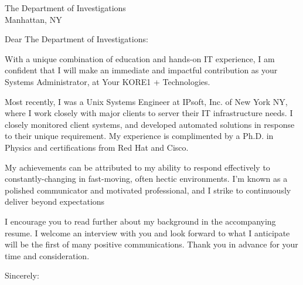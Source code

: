 \documentclass[
    jphafner,
    fontsize=11pt,
    foldmarks=false,
    pagenumber=false,
    addrfield=true,
]{scrlttr2}
\date{\today}
\begin{document}
\begin{letter}{The Department of Investigations \\ Manhattan, NY} %
\opening{Dear The Department of Investigations:}

With a unique combination of education and hands-on IT experience, I am confident that I will make an immediate and impactful contribution as your Systems Administrator, at Your KORE1 + Technologies.


Most recently, I was a Unix Systems Engineer at IPsoft, Inc. of New York NY, where I work closely with major clients to server their IT infrastructure needs. 
    I closely monitored client systems, and developed automated solutions in response to their unique requirement.
    My experience is complimented by a Ph.D. in Physics and certifications from Red Hat and Cisco.


My achievements can be attributed to my ability to respond effectively to constantly-changing in fast-moving, often hectic environments. 
    I’m known as a polished communicator and motivated professional, and I strike to continuously deliver beyond expectations


I encourage you to read further about my background in the accompanying resume. 
    I welcome an interview with you and look forward to what I anticipate will be the first of many positive communications. 
    Thank you in advance for your time and consideration.

\closing{Sincerely:}
\end{letter}
\end{document}
